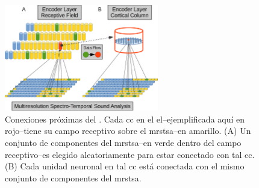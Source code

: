 
\begin{figure}[h!]
    \centering
    \includegraphics[width=0.6\textwidth]{EncoderProximalConnections.png}
    \caption{Conexiones próximas del . Cada \gls{cc} en el \gls{el}--ejemplificada aquí en rojo--tiene su campo receptivo sobre el \gls{mrstsa}--en amarillo.
    (A) Un conjunto de componentes del \gls{mrstsa}--en verde dentro del campo receptivo--es elegido aleatoriamente para estar conectado con tal \gls{cc}.
    (B) Cada unidad neuronal en tal \gls{cc} está conectada con el mismo conjunto de componentes del \gls{mrstsa}.}
    \label{fig:EncoderProximalConnections}
\end{figure}


